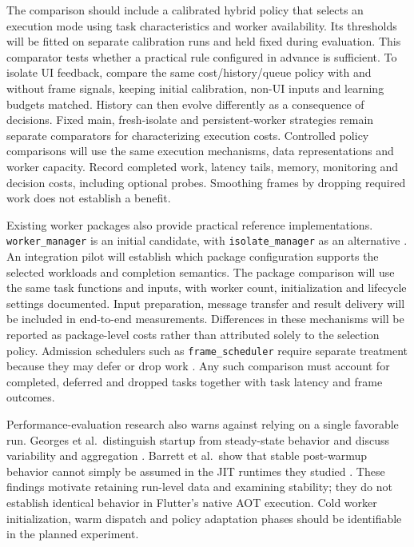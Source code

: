 \documentclass[14pt,a4paper,oneside]{extreport}
\begin{document}
The comparison should include a calibrated hybrid policy that selects an execution mode
using task characteristics and worker availability. Its thresholds will be fitted on separate
calibration runs and held fixed during evaluation. This comparator tests whether a practical
rule configured in advance is sufficient. To isolate UI feedback, compare the same
cost/history/queue policy with and without frame signals, keeping initial calibration, non-UI
inputs and learning budgets matched. History can then evolve differently as a consequence of
decisions. Fixed main, fresh-isolate and persistent-worker strategies remain separate
comparators for characterizing execution costs. Controlled policy comparisons will use the
same execution mechanisms, data representations and worker capacity. Record completed work,
latency tails, memory, monitoring and decision costs, including optional probes. Smoothing
frames by dropping required work does not establish a benefit.

Existing worker packages also provide practical reference implementations.
\texttt{worker\_manager} is an initial candidate, with \texttt{isolate\_manager} as an
alternative \citep{worker-manager, isolate-manager}. An integration pilot will establish
which package configuration supports the selected workloads and completion semantics. The
package comparison will use the same task functions and inputs, with worker count,
initialization and lifecycle settings documented. Input preparation, message transfer and
result delivery will be included in end-to-end measurements. Differences in these mechanisms
will be reported as package-level costs rather than attributed solely to the selection
policy. Admission schedulers such as \texttt{frame\_scheduler} require separate treatment
because they may defer or drop work \citep{frame-scheduler}. Any such comparison must account
for completed, deferred and dropped tasks together with task latency and frame outcomes.

Performance-evaluation research also warns against relying on a single favorable run. Georges
et al.~distinguish startup from steady-state behavior and discuss variability and aggregation
\citep{georges2007}. Barrett et al.~show that stable post-warmup behavior cannot simply be
assumed in the JIT runtimes they studied \citep{barrett2017}. These findings motivate
retaining run-level data and examining stability; they do not establish identical behavior in
Flutter's native AOT execution. Cold worker initialization, warm dispatch and policy
adaptation phases should be identifiable in the planned experiment.
\end{document}
